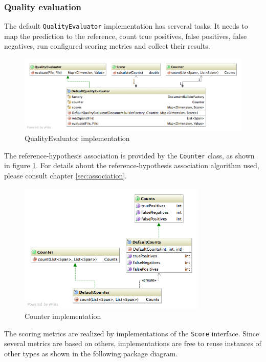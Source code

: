 \newpage
\subsubsection{Quality evaluation}
The default \texttt{QualityEvaluator} implementation has serveral tasks. It needs to map the prediction to the reference, count true positives, false positives, false negatives, run configured scoring metrics and collect their results.

\begin{figure}[H]
\centering
\includegraphics[width=\textwidth, trim=20px 20px 0 0, clip=true]{quality-evaluation.png}
\caption{QualityEvaluator implementation}
\end{figure}

The reference-hypothesis association is provided by the \texttt{Counter} class, as shown in figure \ref{fig:counter}. For details about the reference-hypothesis association algorithm used, please consult chapter \ref{sec:association}.

\begin{figure}[H]
\centering
\includegraphics[width=0.8\textwidth, trim=20px 20px 0 0, clip=true]{counter.png}
\caption{Counter implementation}
\label{fig:counter}
\end{figure}

The scoring metrics are realized by implementations of the \texttt{Score} interface. Since several metrics are based on others, implementations are free to reuse instances of other types as shown in the following package diagram.

